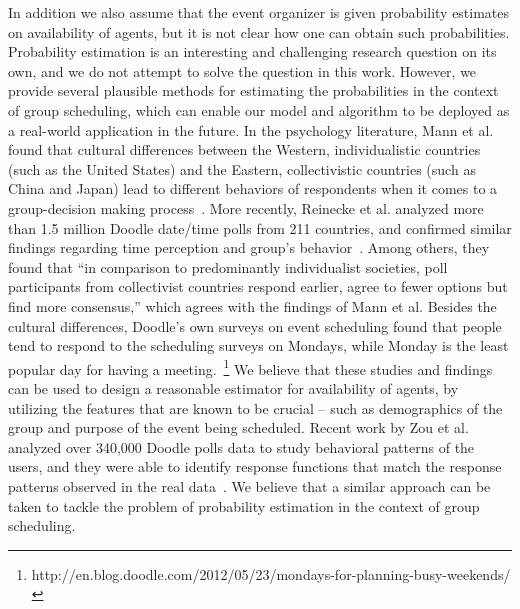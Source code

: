 In addition we also  assume that the event organizer is given probability estimates on availability of agents, but it is not clear how one can obtain such probabilities. 
 Probability estimation is an interesting and challenging research question on its own, and we do not attempt to solve the question in this work. However, we provide several plausible methods for estimating the probabilities in the context of group scheduling, which can enable our model and algorithm to be deployed as a real-world application in the future.
 In the psychology literature, Mann et al. found that cultural differences between the Western, individualistic countries (such as the United States) and the Eastern, collectivistic countries (such as China and Japan) lead to different behaviors of respondents when it comes to a group-decision making process~\cite{mann1998cross}.
 More recently, Reinecke et al. analyzed more than 1.5 million Doodle date/time polls from 211 countries, and confirmed similar findings regarding time perception and group's behavior~\cite{reinecke2013doodle}. Among others, they found that ``in comparison to predominantly individualist societies, poll participants from collectivist countries respond earlier, agree to fewer options but find more consensus,'' which agrees with the findings of Mann et al.
 Besides the cultural differences, Doodle's own surveys on event scheduling found that people tend to respond to the scheduling surveys on Mondays, while Monday is the least popular day for having a meeting.~\footnote{http://en.blog.doodle.com/2012/05/23/mondays-for-planning-busy-weekends/}
 We believe that these studies and findings can be used to design a reasonable estimator for availability of agents, by utilizing the features that are known to be crucial -- such as demographics of the group and purpose of the event being scheduled.
 Recent work by Zou et al. analyzed over 340,000 Doodle polls data to study behavioral patterns of the users, and they were able to identify response functions that match the response patterns observed in the real data~\cite{zou2015strategic}. We believe that a similar approach can be taken to tackle the problem of probability estimation in the context of group scheduling.

